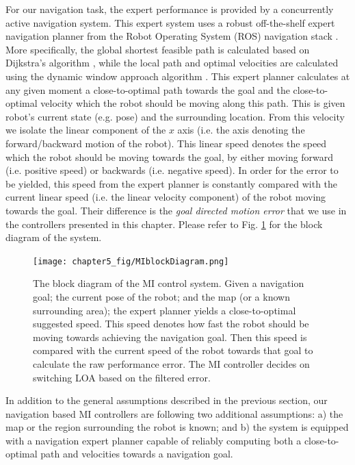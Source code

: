 \documentclass[a4paper,12pt,oneside,openright]{bhamthesis}
\begin{document}
For our navigation task, the expert performance is provided by a concurrently active navigation system. This expert system uses a robust off-the-shelf expert navigation planner from the Robot Operating System (ROS) navigation stack \cite{Marder-Eppstein2010}. More specifically, the global shortest feasible path is calculated based on Dijkstra's algorithm \cite{Dijkstra1959}, while the local path and optimal velocities are calculated using the dynamic window approach algorithm \cite{dwa_planner}. This expert planner calculates at any given moment a close-to-optimal path towards the goal and the close-to-optimal velocity which the robot should be moving along this path. This is given robot's current state (e.g. pose) and the surrounding location. From this velocity we isolate the linear component of the $x$ axis (i.e. the axis denoting the forward/backward motion of the robot). This linear speed denotes the speed which the robot should be moving towards the goal, by either moving forward (i.e. positive speed) or backwards (i.e. negative speed). In order for the error to be yielded, this speed from the expert planner is constantly compared with the current linear speed (i.e. the linear velocity component) of the robot moving towards the goal. Their difference is the \textit{goal directed motion error} that we use in the controllers presented in this chapter. Please refer to Fig. \ref{fig:block_diagram} for the block diagram of the system.

\begin{figure}
	\centering
	\texttt{[image: chapter5\_fig/MIblockDiagram.png]}
	\caption{The block diagram of the MI control system. Given a navigation goal; the current pose of the robot; and the map (or a known surrounding area); the expert planner yields a close-to-optimal suggested speed. This speed denotes how fast the robot should be moving towards achieving the navigation goal. Then this speed is compared with the current speed of the robot towards that goal to calculate the raw performance error. The MI controller decides on switching LOA based on the filtered error.} 
	\label{fig:block_diagram}
\end{figure}

In addition to the general assumptions described in the previous section, our navigation based MI controllers are following two additional assumptions: a) the map or the region surrounding the robot is known; and b) the system is equipped with a navigation expert planner capable of reliably computing both a close-to-optimal path and velocities towards a navigation goal.
 
\end{document}
